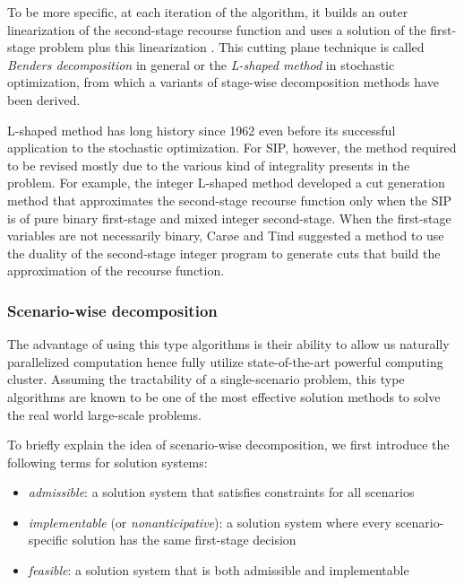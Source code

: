 To be more specific, at each iteration of the algorithm, it builds an outer linearization of the second-stage recourse function and uses a solution of the first-stage problem plus this linearization \cite{book:BL2011}. This cutting plane technique is called \textit{Benders decomposition} \cite{journal:B1962} in general or the \textit{L-shaped method} in stochastic optimization, from which a variants of stage-wise decomposition methods have been derived. 

L-shaped method has long history since 1962 even before its successful application to the stochastic optimization. For SIP, however, the method required to be revised mostly due to the various kind of integrality presents in the problem. For example, the integer L-shaped method \cite{journal:LL1993} developed a cut generation method that approximates the second-stage recourse function only when the SIP is of pure binary first-stage and mixed integer second-stage. When the first-stage variables are not necessarily binary, Car{\o}e and Tind \cite{journal:CT1998} suggested a method to use the duality of the second-stage integer program to generate cuts that build the approximation of the recourse function.

\subsubsection{Scenario-wise decomposition}
The advantage of using this type algorithms is their ability to allow us naturally parallelized computation hence fully utilize state-of-the-art powerful computing cluster. Assuming the tractability of a single-scenario problem, this type algorithms are known to be one of the most effective solution methods to solve the real world large-scale problems.

To briefly explain the idea of scenario-wise decomposition, we first introduce the following terms for solution systems:
\begin{itemize}
	\item \textit{admissible}: a solution system that satisfies constraints for all scenarios
	\item \textit{implementable} (or \textit{nonanticipative}): a solution system where every scenario-specific solution has the same first-stage decision
	\item \textit{feasible}: a solution system that is both admissible and implementable
\end{itemize}

